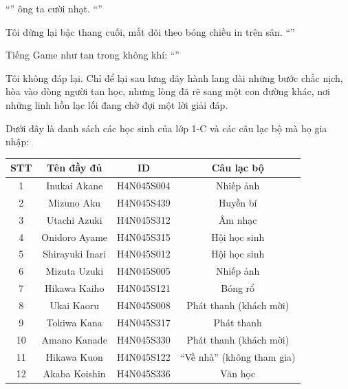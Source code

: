 \documentclass[../main.tex]{subfiles}
\begin{document}
``'' ông ta cười nhạt. ``''

Tôi dừng lại bậc thang cuối, mắt dõi theo bóng chiều in trên sân. ``''

Tiếng Game như tan trong không khí: ``''

Tôi không đáp lại. Chỉ để lại sau lưng dãy hành lang dài những bước chắc nịch, hòa vào dòng người tan học, nhưng lòng đã rẽ sang một con đường khác, nơi những linh hồn lạc lối đang chờ đợi một lời giải đáp.
\newpage

\trva

Dưới đây là danh sách các học sinh của lớp 1-C và các câu lạc bộ mà họ gia nhập:

\begin{center}
  \begin{tabular}{|c|c|c|c|}
    \hline
    \textbf{STT} & \textbf{Tên đầy đủ} & \textbf{ID} & \textbf{Câu lạc bộ}         \\ \hline
    1            & Inukai Akane        & H4N045S004  & Nhiếp ảnh                   \\ \hline
    2            & Mizuno Aku          & H4N045S439  & Huyền bí                    \\ \hline
    3            & Utachi Azuki        & H4N045S312  & Âm nhạc                     \\ \hline
    4            & Onidoro Ayame       & H4N045S315  & Hội học sinh                \\ \hline
    5            & Shirayuki Inari     & H4N045S012  & Hội học sinh                \\ \hline
    6            & Mizuta Uzuki        & H4N045S005  & Nhiếp ảnh                   \\ \hline
    7            & Hikawa Kaiho        & H4N045S121  & Bóng rổ                     \\ \hline
    8            & Ukai Kaoru          & H4N045S008  & Phát thanh (khách mời)      \\ \hline
    9            & Tokiwa Kana         & H4N045S317  & Phát thanh                  \\ \hline
    10           & Amano Kanade        & H4N045S330  & Phát thanh (khách mời)      \\ \hline
    11           & Hikawa Kuon         & H4N045S122  & ``Về nhà'' (không tham gia) \\ \hline
    12           & Akaba Koishin       & H4N045S336  & Văn học                     \\ \hline

\end{tabular}
\end{center}
\end{document}
